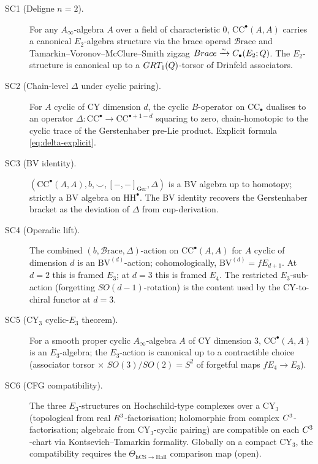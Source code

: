 \documentclass[11pt]{article}
\theoremstyle{definition}
\theoremstyle{remark}
\newcommand{\CC}{\mathrm{CC}}
\newcommand{\HH}{\mathrm{HH}}
\newcommand{\Br}{\mathcal{B}\mathrm{race}}
\newcommand{\Ger}{\mathrm{Ger}}
\newcommand{\Ainf}{A_{\infty}}
\begin{document}
\begin{description}
\item[SC1 (Deligne $n=2$).] For any $\Ainf$-algebra $A$ over a field
of characteristic $0$, $\CC^\bullet(A,A)$ carries a canonical
$E_2$-algebra structure via the brace operad $\Br$ and
Tamarkin--Voronov--McClure--Smith zigzag
$\Br \xrightarrow{\sim} C_\bullet(E_2; \Q)$. The
$E_2$-structure is canonical up to a $GRT_1(Q)$-torsor
of Drinfeld associators.

\item[SC2 (Chain-level $\Delta$ under cyclic pairing).] For $A$
cyclic of CY dimension $d$, the cyclic $B$-operator on $\CC_\bullet$
dualises to an operator $\Delta: \CC^\bullet \to \CC^{\bullet + 1 - d}$
squaring to zero, chain-homotopic to the cyclic trace of the
Gerstenhaber pre-Lie product. Explicit formula
\eqref{eq:delta-explicit}.

\item[SC3 (BV identity).] $(\CC^\bullet(A,A), b, \smile, [-,-]_\Ger,
\Delta)$ is a BV algebra up to homotopy; strictly a BV algebra on
$\HH^\bullet$. The BV identity recovers the Gerstenhaber bracket as
the deviation of $\Delta$ from cup-derivation.

\item[SC4 (Operadic lift).] The combined $(b, \Br, \Delta)$-action
on $\CC^\bullet(A,A)$ for $A$ cyclic of dimension $d$ is an
$\mathrm{BV}^{(d)}$-action; cohomologically,
$\mathrm{BV}^{(d)} = fE_{d+1}$. At $d = 2$ this is framed $E_3$; at
$d = 3$ this is framed $E_4$. The restricted $E_3$-sub-action
(forgetting $SO(d-1)$-rotation) is the content used by the
CY-to-chiral functor at $d = 3$.

\item[SC5 (CY$_3$ cyclic-$E_3$ theorem).] For a smooth proper cyclic
$\Ainf$-algebra $A$ of CY dimension $3$, $\CC^\bullet(A,A)$ is an
$E_3$-algebra; the $E_3$-action is canonical up to a contractible
choice (associator torsor $\times$ $SO(3)/SO(2) = S^2$ of forgetful
maps $fE_4 \to E_3$).

\item[SC6 (CFG compatibility).] The three $E_3$-structures on
Hochschild-type complexes over a CY$_3$ (topological from real
$R^3$-factorisation; holomorphic from complex $C^3$-factorisation;
algebraic from CY$_3$-cyclic pairing) are compatible on each
$C^3$-chart via Kontsevich--Tamarkin formality. Globally on a
compact CY$_3$, the compatibility requires the
$\Theta_{\mathrm{hCS} \to \mathrm{Hall}}$ comparison map (open).
\end{description}
\end{document}
